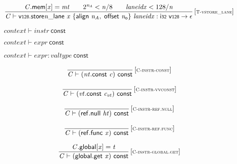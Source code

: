 $$
\begin{array}{@{}c@{}}\displaystyle
\frac{
{\mathit{C}}.\mathsf{mem}{}[{\mathit{x}}] = {\mathit{mt}}
 \qquad
{2^{{\mathit{n}}_{{\mathit{A}}}}} < {\mathit{n}} / 8
 \qquad
{\mathit{laneidx}} < 128 / {\mathit{n}}
}{
{\mathit{C}} \vdash {{{\mathsf{v{\scriptstyle128}.store}}{{\mathit{n}}}}{\mathsf{\_}}}{\mathsf{lane}}~{\mathit{x}}~\{ \begin{array}[t]{@{}l@{}}
\mathsf{align}~{\mathit{n}}_{{\mathit{A}}},\; \mathsf{offset}~{\mathit{n}}_{{\mathsf{o}}} \}\end{array}~{\mathit{laneidx}} : \mathsf{i{\scriptstyle32}}~\mathsf{v{\scriptstyle128}} \rightarrow \epsilon
} \, {[\textsc{\scriptsize T{-}vstore\_lane}]}
\qquad
\end{array}
$$

\vspace{1ex}

$\boxed{{\mathit{context}} \vdash {\mathit{instr}}~\mathsf{const}}$

$\boxed{{\mathit{context}} \vdash {\mathit{expr}}~\mathsf{const}}$

$\boxed{{\mathit{context}} \vdash {\mathit{expr}} : {\mathit{valtype}}~\mathsf{const}}$

$$
\begin{array}{@{}c@{}}\displaystyle
\frac{
}{
{\mathit{C}} \vdash ({\mathit{nt}}.\mathsf{const}~{\mathit{c}})~\mathsf{const}
} \, {[\textsc{\scriptsize C{-}instr{-}const}]}
\qquad
\end{array}
$$

$$
\begin{array}{@{}c@{}}\displaystyle
\frac{
}{
{\mathit{C}} \vdash ({\mathit{vt}}.\mathsf{const}~{\mathit{c}}_{{\mathit{vt}}})~\mathsf{const}
} \, {[\textsc{\scriptsize C{-}instr{-}vvconst}]}
\qquad
\end{array}
$$

$$
\begin{array}{@{}c@{}}\displaystyle
\frac{
}{
{\mathit{C}} \vdash (\mathsf{ref.null}~{\mathit{ht}})~\mathsf{const}
} \, {[\textsc{\scriptsize C{-}instr{-}ref.null}]}
\qquad
\end{array}
$$

$$
\begin{array}{@{}c@{}}\displaystyle
\frac{
}{
{\mathit{C}} \vdash (\mathsf{ref.func}~{\mathit{x}})~\mathsf{const}
} \, {[\textsc{\scriptsize C{-}instr{-}ref.func}]}
\qquad
\end{array}
$$

$$
\begin{array}{@{}c@{}}\displaystyle
\frac{
{\mathit{C}}.\mathsf{global}{}[{\mathit{x}}] = {\mathit{t}}
}{
{\mathit{C}} \vdash (\mathsf{global.get}~{\mathit{x}})~\mathsf{const}
} \, {[\textsc{\scriptsize C{-}instr{-}global.get}]}
\qquad
\end{array}
$$

